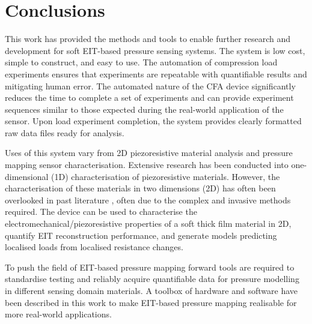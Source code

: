 

\section{Conclusions}
This work has provided the methods and tools to enable further research and development for soft EIT-based pressure sensing systems. The system is low cost, simple to construct, and easy to use. The automation of compression load experiments ensures that experiments are repeatable with quantifiable results and mitigating human error. The automated nature of the CFA device significantly reduces the time to complete a set of experiments and can provide experiment sequences similar to those expected during the real-world application of the sensor. Upon load experiment completion, the system provides clearly formatted raw data files ready for analysis.


Uses of this system vary from 2D piezoresistive material analysis and pressure mapping sensor characterisation. Extensive research has been conducted into one-dimensional (1D) characterisation of piezoresistive materials. However, the characterisation of these materials in two dimensions (2D) has often been overlooked in past literature \cite{Ding2007,Shang2016,Buketov2020,Zhao2013}, often due to the complex and invasive methods required. The device can be used to characterise the electromechanical/piezoresistive properties of a soft thick film material in 2D, quantify EIT reconstruction performance, and generate models predicting localised loads from localised resistance changes.

To push the field of EIT-based pressure mapping forward tools are required to standardise testing and reliably acquire quantifiable data for pressure modelling in different sensing domain materials. A toolbox of hardware and software have been described in this work to make EIT-based pressure mapping realisable for more real-world applications.

